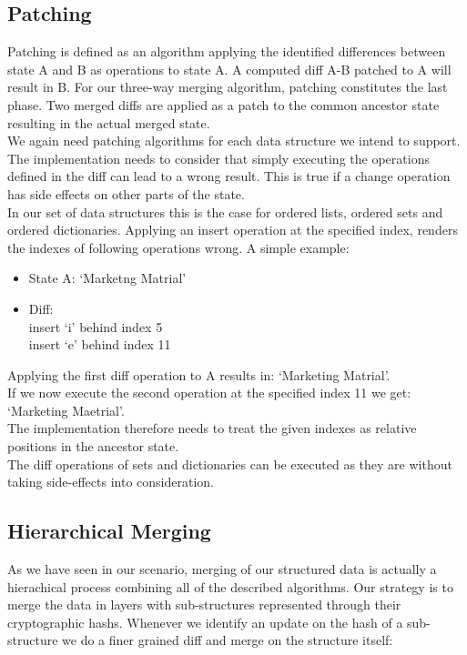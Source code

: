 \subsection{Patching}
\label{sec:histo.merging.patching}

Patching is defined as an algorithm applying the identified differences between state A and B as operations to state A.
A computed diff A-B patched to A will result in B.
For our three-way merging algorithm, patching constitutes the last phase. 
Two merged diffs are applied as a patch to the common ancestor state resulting in the actual merged state.\\
We again need patching algorithms for each data structure we intend to support.
The implementation needs to consider that simply executing the operations defined in the diff can lead to a wrong result.
This is true if a change operation has side effects on other parts of the state.\\
In our set of data structures this is the case for ordered lists, ordered sets and ordered dictionaries.
Applying an insert operation at the specified index, renders the indexes of following operations wrong.
A simple example:

\begin{itemize}
\item State A: `Marketng Matrial'
\item Diff:\\
insert `i' behind index 5\\
insert `e' behind index 11
\end{itemize}

Applying the first diff operation to A results in: `Marketing Matrial'.\\
If we now execute the second operation at the specified index 11 we get: `Marketing Maetrial'.\\
The implementation therefore needs to treat the given indexes as relative positions in the ancestor state.\\
The diff operations of sets and dictionaries can be executed as they are without taking side-effects into consideration.

\subsection{Hierarchical Merging}
As we have seen in our scenario, merging of our structured data is actually a hierachical process combining all of the described algorithms.
Our strategy is to merge the data in layers with sub-structures represented through their cryptographic hashs.
Whenever we identify an update on the hash of a sub-structure we do a finer grained diff and merge on the structure itself:

